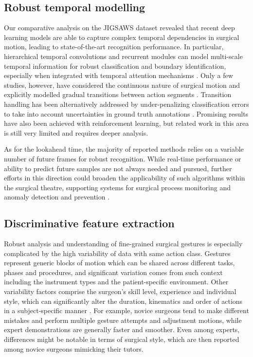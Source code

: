 \documentclass[journal]{IEEEtran}
\begin{document}
\subsection{Robust temporal modelling}
Our comparative analysis on the JIGSAWS dataset revealed that recent deep learning models are able to capture complex temporal dependencies in surgical motion, leading to state-of-the-art recognition performance. 
In particular, hierarchical temporal convolutions and recurrent modules can model multi-scale temporal information for robust classification and boundary identification, especially when integrated with temporal attention mechanisms \cite{Zhang2020, Qin2020b}. 
Only a few studies, however, have considered the continuous nature of surgical motion and explicitly modelled gradual transitions between action segments \cite{Fard2017, Fox2017, Tsai2019, Tsai2019unsup}. Transition handling has been alternatively addressed by under-penalizing classification errors to take into account uncertainties in ground truth annotations \cite{Gao2016align}. Promising results have also been achieved with reinforcement learning, but related work in this area is still very limited and requires deeper analysis. 

As for the lookahead time, the majority of reported methods relies on a variable number of future frames for robust recognition. While real-time performance or ability to predict future samples are not always needed and pursued, further efforts in this direction could broaden the applicability of such algorithms within the surgical theatre, supporting systems for surgical process monitoring and anomaly detection and prevention \cite{Yasar2020, Qin2020b}. 

\subsection{Discriminative feature extraction} \label{Discriminative feature extraction}

Robust analysis and understanding of fine-grained surgical gestures is especially complicated by the high variability of data with same action class.
Gestures represent generic blocks of motion which can be shared across different tasks, phases and procedures, and significant variation comes from such context including the instrument types and the patient-specific environment. Other variability factors comprise the surgeon's skill level, experience and individual style, which can significantly alter the duration, kinematics and order of actions in a subject-specific manner \cite{Ahmidi2017}. For example, novice surgeons tend to make different mistakes and perform multiple gesture attempts and adjustment motions, while expert demonstrations are generally faster and smoother. Even among experts, differences might be notable in terms of surgical style, which are then reported among novice surgeons mimicking their tutors.
\end{document}
